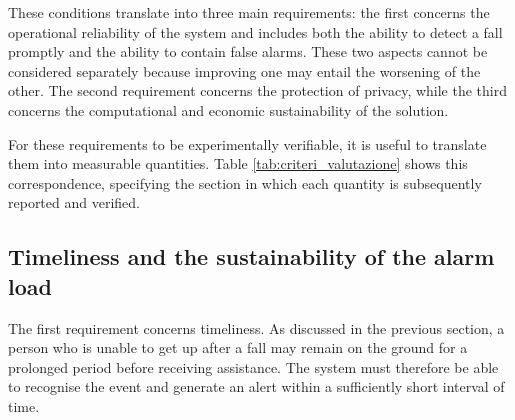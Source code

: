 These conditions translate into three main requirements: the first concerns
the operational reliability of the system and includes both the ability to
detect a fall promptly and the ability to contain false alarms. These two
aspects cannot be considered separately because improving one may entail the
worsening of the other. The second requirement concerns the protection of
privacy, while the third concerns the computational and economic
sustainability of the solution.

For these requirements to be experimentally verifiable, it is useful to translate them into measurable quantities. Table \ref{tab:criteri_valutazione} shows this correspondence, specifying the section in which each quantity is subsequently reported and verified.

\begin{table}[htbp]
\centering
\caption{Criteria used to evaluate the system.}
\label{tab:criteri_valutazione}
\end{table}

\subsection{Timeliness and the sustainability of the alarm load}

The first requirement concerns timeliness. As discussed in the previous
section, a person who is unable to get up after a fall may remain on the
ground for a prolonged period before receiving assistance. The system must
therefore be able to recognise the event and generate an alert within a
sufficiently short interval of time.

